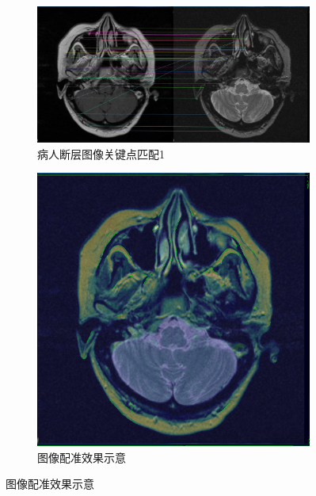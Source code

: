 \documentclass[a4paper, utf8]{ctexart}
\begin{document}
\begin{figure}[htbp]
		\begin{subfigure}{.6\textwidth}
			\centering
			\includegraphics[height=.13\textheight]{./figure/match_opencv_2.png}
			\caption{病人断层图像关键点匹配1}
		\end{subfigure}
		\begin{subfigure}{.3\textwidth}
			\centering
			\includegraphics[height=.13\textheight]{./figure/compare_opencv_2.png}
			\caption{图像配准效果示意}
		\end{subfigure}
		

\end{figure}
\end{document}

